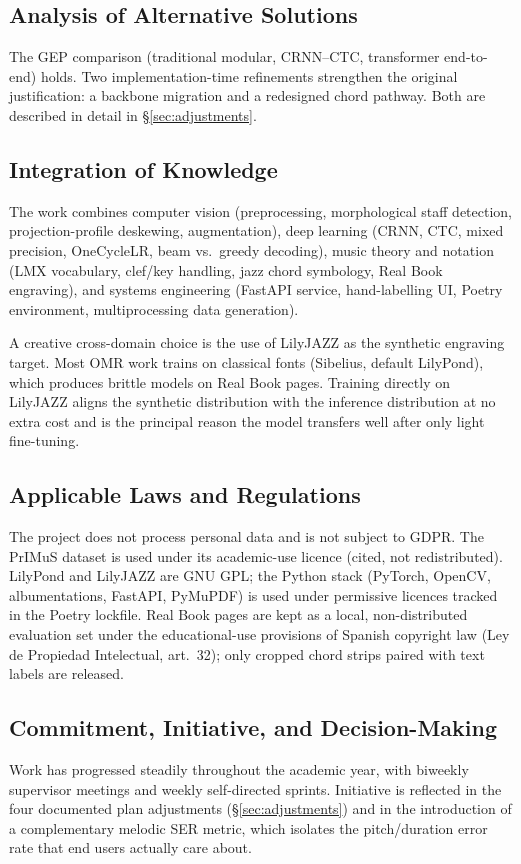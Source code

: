 \documentclass[11pt, a4paper]{article}
\begin{document}
\subsection{Analysis of Alternative Solutions}
The GEP comparison (traditional modular, CRNN--CTC, transformer end-to-end) holds. Two implementation-time refinements strengthen the original justification: a backbone migration and a redesigned chord pathway. Both are described in detail in \S\ref{sec:adjustments}.

\subsection{Integration of Knowledge}
The work combines computer vision (preprocessing, morphological staff detection, projection-profile deskewing, augmentation), deep learning (CRNN, CTC, mixed precision, OneCycleLR, beam vs.\ greedy decoding), music theory and notation (LMX vocabulary, clef/key handling, jazz chord symbology, Real Book engraving), and systems engineering (FastAPI service, hand-labelling UI, Poetry environment, multiprocessing data generation).

A creative cross-domain choice is the use of LilyJAZZ as the synthetic engraving target. Most OMR work trains on classical fonts (Sibelius, default LilyPond), which produces brittle models on Real Book pages. Training directly on LilyJAZZ aligns the synthetic distribution with the inference distribution at no extra cost and is the principal reason the model transfers well after only light fine-tuning.

\subsection{Applicable Laws and Regulations}
The project does not process personal data and is not subject to GDPR. The PrIMuS dataset is used under its academic-use licence (cited, not redistributed). LilyPond and LilyJAZZ are GNU GPL; the Python stack (PyTorch, OpenCV, albumentations, FastAPI, PyMuPDF) is used under permissive licences tracked in the Poetry lockfile. Real Book pages are kept as a local, non-distributed evaluation set under the educational-use provisions of Spanish copyright law (Ley de Propiedad Intelectual, art.~32); only cropped chord strips paired with text labels are released.

\subsection{Commitment, Initiative, and Decision-Making}
Work has progressed steadily throughout the academic year, with biweekly supervisor meetings and weekly self-directed sprints. Initiative is reflected in the four documented plan adjustments (\S\ref{sec:adjustments}) and in the introduction of a complementary melodic SER metric, which isolates the pitch/duration error rate that end users actually care about.
\end{document}
